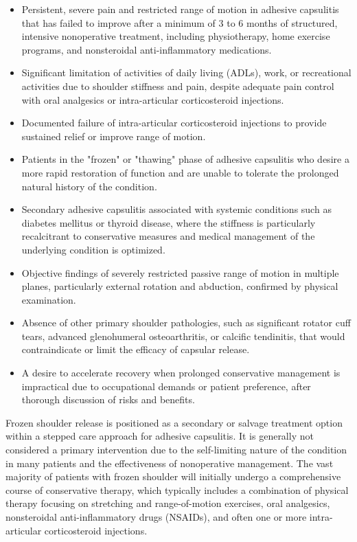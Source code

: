 \begin{itemize}
  \item Persistent, severe pain and restricted range of motion in adhesive capsulitis that has failed to improve after a minimum of 3 to 6 months of structured, intensive nonoperative treatment, including physiotherapy, home exercise programs, and nonsteroidal anti-inflammatory medications.
  \item Significant limitation of activities of daily living (ADLs), work, or recreational activities due to shoulder stiffness and pain, despite adequate pain control with oral analgesics or intra-articular corticosteroid injections.
  \item Documented failure of intra-articular corticosteroid injections to provide sustained relief or improve range of motion.
  \item Patients in the "frozen" or "thawing" phase of adhesive capsulitis who desire a more rapid restoration of function and are unable to tolerate the prolonged natural history of the condition.
  \item Secondary adhesive capsulitis associated with systemic conditions such as diabetes mellitus or thyroid disease, where the stiffness is particularly recalcitrant to conservative measures and medical management of the underlying condition is optimized.
  \item Objective findings of severely restricted passive range of motion in multiple planes, particularly external rotation and abduction, confirmed by physical examination.
  \item Absence of other primary shoulder pathologies, such as significant rotator cuff tears, advanced glenohumeral osteoarthritis, or calcific tendinitis, that would contraindicate or limit the efficacy of capsular release.
  \item A desire to accelerate recovery when prolonged conservative management is impractical due to occupational demands or patient preference, after thorough discussion of risks and benefits.
\end{itemize}

Frozen shoulder release is positioned as a secondary or salvage treatment option within a stepped care approach for adhesive capsulitis. It is generally not considered a primary intervention due to the self-limiting nature of the condition in many patients and the effectiveness of nonoperative management. The vast majority of patients with frozen shoulder will initially undergo a comprehensive course of conservative therapy, which typically includes a combination of physical therapy focusing on stretching and range-of-motion exercises, oral analgesics, nonsteroidal anti-inflammatory drugs (NSAIDs), and often one or more intra-articular corticosteroid injections.

